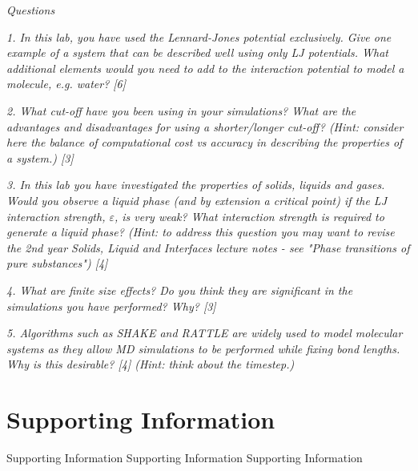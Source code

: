 \documentclass[a4paper,10pt,twocolumn]{article}
\begin{document}
\textit{Questions}

\textit{1. In this lab, you have used the Lennard-Jones potential exclusively. Give one example of a system that can be described well using only LJ potentials. What additional elements would you need to add to the interaction potential to model a molecule, e.g. water? [6]}

\textit{2. What cut-off have you been using in your simulations? What are the advantages and disadvantages for using a shorter/longer cut-off? (Hint: consider here the balance of computational cost vs accuracy in describing the properties of a system.) [3]}

\textit{3. In this lab you have investigated the properties of solids, liquids and gases. Would you observe a liquid phase (and by extension a critical point) if the LJ interaction strength, $\varepsilon$, is
very weak? What interaction strength is required to generate a liquid phase? (Hint: to address this question you may want to revise the 2nd year Solids, Liquid and Interfaces lecture notes - see "Phase transitions of pure substances") [4]}

\textit{4. What are finite size effects? Do you think they are significant in the simulations you have performed? Why? [3]}

\textit{5. Algorithms such as SHAKE and RATTLE are widely used to model molecular systems as they allow MD simulations to be performed while fixing bond lengths. Why is this desirable? [4] (Hint: think about the timestep.)}

    
{\small
\setlength{\bibsep}{0pt}


}

\onecolumn 

\newpage
\section*{Supporting Information} 
\setcounter{figure}{0}
\renewcommand{\thefigure}{S\arabic{figure}}
\setcounter{table}{0}
\renewcommand{\thetable}{S\arabic{table}}
\setcounter{page}{1}
\renewcommand{\thepage}{S\arabic{page}}

Supporting Information Supporting Information Supporting Information
\end{document}
